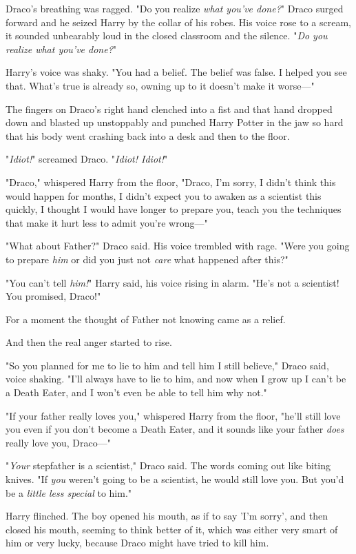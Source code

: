 Draco's breathing was ragged. "Do you realize \emph{what you've done?}" Draco 
surged forward and he seized Harry by the collar of his robes. His voice rose 
to a scream, it sounded unbearably loud in the closed classroom and the 
silence. "\emph{Do you realize what you've done?}"

Harry's voice was shaky. "You had a belief. The belief was false. I helped you 
see that. What's true is already so, owning up to it doesn't make it worse---"

The fingers on Draco's right hand clenched into a fist and that hand dropped 
down and blasted up unstoppably and punched Harry Potter in the jaw so hard 
that his body went crashing back into a desk and then to the floor.

"\emph{Idiot!}" screamed Draco. "\emph{Idiot! Idiot!}"

"Draco," whispered Harry from the floor, "Draco, I'm sorry, I didn't think this 
would happen for months, I didn't expect you to awaken as a scientist this 
quickly, I thought I would have longer to prepare you, teach you the techniques 
that make it hurt less to admit you're wrong---"

"What about Father?" Draco said. His voice trembled with rage. "Were you going 
to prepare \emph{him} or did you just not \emph{care} what happened after this?"

"You can't tell \emph{him!}" Harry said, his voice rising in alarm. "He's not a 
scientist! You promised, Draco!"

For a moment the thought of Father not knowing came as a relief.

And then the real anger started to rise.

"So you planned for me to lie to him and tell him I still believe," Draco said, 
voice shaking. "I'll always have to lie to him, and now when I grow up I can't 
be a Death Eater, and I won't even be able to tell him why not."

"If your father really loves you," whispered Harry from the floor, "he'll still 
love you even if you don't become a Death Eater, and it sounds like your father 
\emph{does} really love you, Draco---"

"\emph{Your} stepfather is a scientist," Draco said. The words coming out like 
biting knives. "If \emph{you} weren't going to be a scientist, he would still 
love you. But you'd be a \emph{little less special} to him."

Harry flinched. The boy opened his mouth, as if to say 'I'm sorry', and then 
closed his mouth, seeming to think better of it, which was either very smart of 
him or very lucky, because Draco might have tried to kill him.

